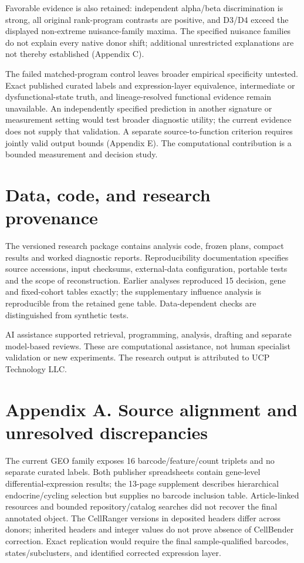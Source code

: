 \documentclass[11pt,letterpaper]{article}
\begin{document}
Favorable evidence is also retained: independent alpha/beta discrimination is strong, all original rank-program contrasts are positive, and D3/D4 exceed the displayed non-extreme nuisance-family maxima. The specified nuisance families do not explain every native donor shift; additional unrestricted explanations are not thereby established (Appendix C).

The failed matched-program control leaves broader empirical specificity untested. Exact published curated labels and expression-layer equivalence, intermediate or dysfunctional-state truth, and lineage-resolved functional evidence remain unavailable. An independently specified prediction in another signature or measurement setting would test broader diagnostic utility; the current evidence does not supply that validation. A separate source-to-function criterion requires jointly valid output bounds (Appendix E). The computational contribution is a bounded measurement and decision study.

\section*{Data, code, and research provenance}
The versioned research package contains analysis code, frozen plans, compact results and worked diagnostic reports. Reproducibility documentation specifies source accessions, input checksums, external-data configuration, portable tests and the scope of reconstruction. Earlier analyses reproduced 15 decision, gene and fixed-cohort tables exactly; the supplementary influence analysis is reproducible from the retained gene table. Data-dependent checks are distinguished from synthetic tests.

AI assistance supported retrieval, programming, analysis, drafting and separate model-based reviews. These are computational assistance, not human specialist validation or new experiments. The research output is attributed to UCP Technology LLC.

\section*{Appendix A. Source alignment and unresolved discrepancies}
The current GEO family exposes 16 barcode/feature/count triplets and no separate curated labels. Both publisher spreadsheets contain gene-level differential-expression results; the 13-page supplement describes hierarchical endocrine/cycling selection but supplies no barcode inclusion table. Article-linked resources and bounded repository/catalog searches did not recover the final annotated object. The CellRanger versions in deposited headers differ across donors; inherited headers and integer values do not prove absence of CellBender correction. Exact replication would require the final sample-qualified barcodes, states/subclusters, and identified corrected expression layer.
\end{document}
